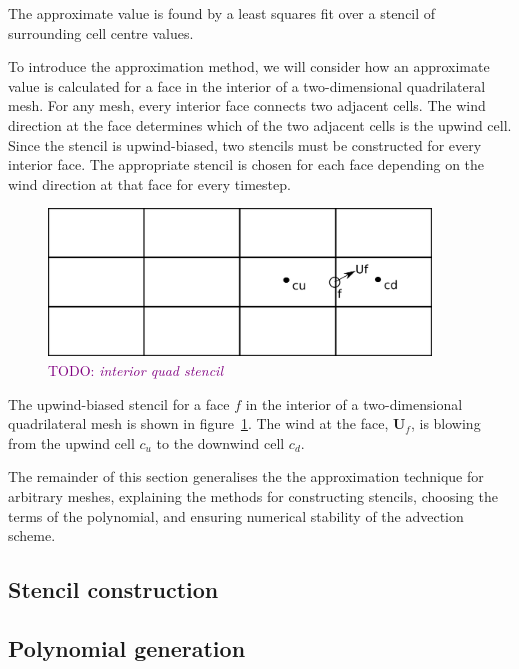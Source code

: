 \documentclass{article}
\newcommand{\TODO}[1]{\textcolor{purple}{TODO: \emph{#1}}}
\begin{document}
The approximate value is found by a least squares fit over a stencil of surrounding cell centre values.

To introduce the approximation method, we will consider how an approximate value is calculated for a face in the interior of a two-dimensional quadrilateral mesh.  For any mesh, every interior face connects two adjacent cells.  The wind direction at the face determines which of the two adjacent cells is the upwind cell.  Since the stencil is upwind-biased, two stencils must be constructed for every interior face.  The appropriate stencil is chosen for each face depending on the wind direction at that face for every timestep.

\begin{figure}
	\includegraphics[width=4in]{interiorQuadStencil.png}
	\caption{\TODO{interior quad stencil}}
	\label{fig:interiorQuadStencil}
\end{figure}

The upwind-biased stencil for a face $f$ in the interior of a two-dimensional quadrilateral mesh is shown in figure~\ref{fig:interiorQuadStencil}.  The wind at the face, $\bm{U}_f$, is blowing from the upwind cell $c_u$ to the downwind cell $c_d$.




The remainder of this section generalises the the approximation technique for arbitrary meshes, explaining the methods for constructing stencils, choosing the terms of the polynomial, and ensuring numerical stability of the advection scheme.


\subsection{Stencil construction}

\subsection{Polynomial generation}
\end{document}
